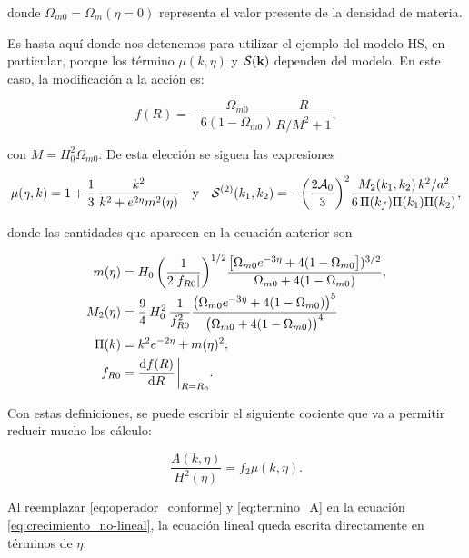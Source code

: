 \documentclass[letterpaper, 12pt]{article}
\begin{document}
        donde $\Omega_{m0} = \Omega_{m}(\eta = 0)$ representa el valor presente de la densidad de materia.

        Es hasta aquí donde nos detenemos para utilizar el ejemplo del modelo HS, en particular, porque los término $\mu(k,\eta)$ y $\mathcal{S}(\vb{k})$ dependen del modelo. En este caso, la modificación a la acción es:
        
        \begin{equation}
            f(R) = -\frac{\Omega_{m0}}{6(1 - \Omega_{m0})} \frac{R}{R/M^2 + 1},
        \end{equation}
        
        con $M = H_0^2\Omega_{m0}$. De esta elección se siguen las expresiones
        
        \begin{equation}
            \mu(\eta,k) = 1+\frac13\,\frac{k^2}{k^2+e^{2\eta}m^2(\eta)} \qq{y} 
            \mathcal{S}^{(2)}(k_1,k_2) 
            = -\qty(\frac{2\mathcal{A}_0}{3})^{2} \frac{M_2(k_1,k_2)\,k^2/a^2}{6\,\Pi(k_f)\Pi(k_1)\Pi(k_2)},
        \end{equation}
        
        donde las cantidades que aparecen en la ecuación anterior son
        
        \begin{align}
            m(\eta) 
            &= H_0\,\qty(\frac{1}{2|f_{R0}|})^{1/2} \frac{\qty[\Omega_{m0} e^{-3\eta}+4(1-\Omega_{m0}])^{3/2}}{\Omega_{m0}+4(1-\Omega_{m0})}, \\
            M_2(\eta) 
            &= \frac94\,H_0^2\,\frac{1}{f_{R0}^2} \frac{\big(\Omega_{m0} e^{-3\eta}+4(1-\Omega_{m0})\big)^{5}}{\big(\Omega_{m0}+4(1-\Omega_{m0})\big)^{4}} \\
            \Pi(k) 
            &= k^2e^{-2\eta}+m(\eta)^2, \\
            f_{R0} &= \dv{f(R)}{R}\eval_{R = R_0}.
        \end{align}
        
        Con estas definiciones, se puede escribir el siguiente cociente que va a permitir reducir mucho los cálculo:
        
        \begin{equation}
            \frac{A(k,\eta)}{H^2(\eta)} = f_2\mu(k,\eta). 
        \end{equation}

        Al reemplazar \ref{eq:operador_conforme} y \ref{eq:termino_A} en la ecuación \ref{eq:crecimiento_no-lineal}, la ecuación lineal queda escrita directamente en términos de $\eta$:
        
\end{document}
